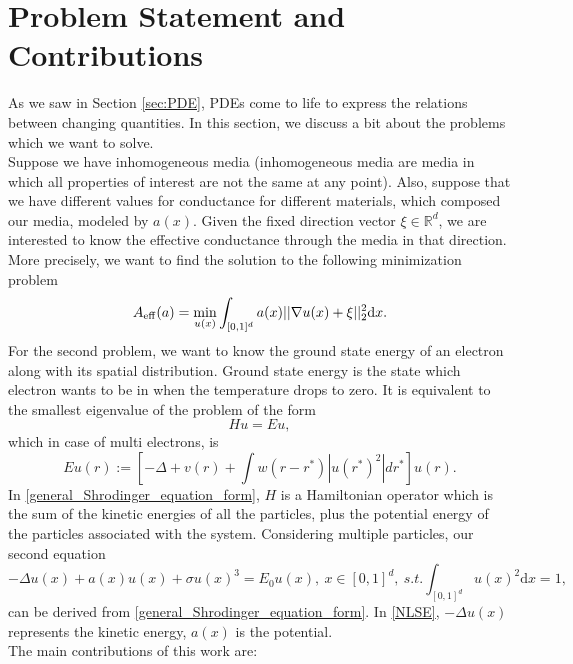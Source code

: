 \section{Problem Statement and Contributions}
As we saw in Section \eqref{sec:PDE}, PDEs come to life to express the relations between changing quantities. In this section, we discuss a bit about the problems which we want to solve.\\
Suppose we have inhomogeneous media (inhomogeneous media are media in which all properties of interest are not the same at any point). Also, suppose that we have different values for conductance for different materials, which composed our media, modeled by $a(x)$. Given the fixed direction vector $\xi \in \mathbb{R}^d$, we are interested to know the effective conductance through the media in that direction. More precisely, we want to find the solution to the following minimization problem 
\begin{equation}
A_{\operatorname{eff}}(a) = \min_{u(x)} \int_{[0,1]^d} a(x) ||\nabla u(x) + \xi||_{2}^{2} \mathrm{d}x.
\label{problem:effective_conductance}
\end{equation}
For the second problem, we want to know the ground state energy of an electron along with its spatial distribution. Ground state energy is the state which electron wants to be in when the temperature drops to zero. It is equivalent to the smallest eigenvalue of the problem of the form
\begin{equation}
\label{general_Shrodinger_equation_form}
Hu = Eu,
\end{equation}
which in case of multi electrons, is
\begin{equation}
Eu(r) := [-\Delta + v(r) + \int w(r-r^*) |u(r^*)^2|dr^*]u(r). 
\end{equation}
In \eqref{general_Shrodinger_equation_form}, $H$ is a Hamiltonian operator which is the sum of the kinetic energies of all the particles, plus the potential energy of the particles associated with the system.
Considering multiple particles, our second equation
\begin{equation}\label{NLSE}
-\Delta u(x) + a(x)u(x) + \sigma u(x)^3 = E_0 u(x), ~ x\in [0,1]^d, ~s.t. \int_{[0,1]^d}u(x)^2 \mathrm{d}x = 1,
\end{equation}
can be derived from \eqref{general_Shrodinger_equation_form}. In \eqref{NLSE}, $-\Delta u(x)$ represents the kinetic energy, $a(x)$ is the potential.\\
The main contributions of this work are:
